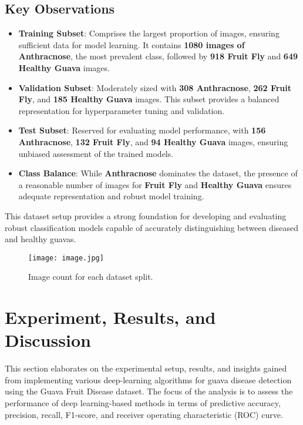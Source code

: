 \documentclass[conference]{IEEEtran}
\begin{document}
\subsection{Key Observations}
\begin{itemize}
    \item \textbf{Training Subset}: Comprises the largest proportion of images, ensuring sufficient data for model learning. It contains \textbf{1080 images of Anthracnose}, the most prevalent class, followed by \textbf{918 Fruit Fly} and \textbf{649 Healthy Guava} images.
    \item \textbf{Validation Subset}: Moderately sized with \textbf{308 Anthracnose}, \textbf{262 Fruit Fly}, and \textbf{185 Healthy Guava} images. This subset provides a balanced representation for hyperparameter tuning and validation.
    \item \textbf{Test Subset}: Reserved for evaluating model performance, with \textbf{156 Anthracnose}, \textbf{132 Fruit Fly}, and \textbf{94 Healthy Guava} images, ensuring unbiased assessment of the trained models.
    \item \textbf{Class Balance}: While \textbf{Anthracnose} dominates the dataset, the presence of a reasonable number of images for \textbf{Fruit Fly} and \textbf{Healthy Guava} ensures adequate representation and robust model training.
\end{itemize}

This dataset setup provides a strong foundation for developing and evaluating robust classification models capable of accurately distinguishing between diseased and healthy guavas.

\begin{figure}[h]
  \centering
  \texttt{[image: image.jpg]}
  \caption{Image count for each dataset split.}
  \label{fig:your_label}
\end{figure}

\section{Experiment, Results, and Discussion}

This section elaborates on the experimental setup, results, and insights gained from implementing various deep-learning algorithms for guava disease detection using the Guava Fruit Disease dataset. The focus of the analysis is to assess the performance of deep learning-based methods in terms of predictive accuracy, precision, recall, F1-score, and receiver operating characteristic (ROC) curve.
\end{document}
